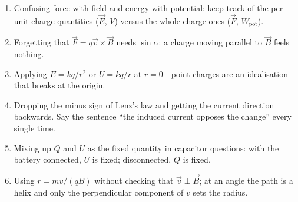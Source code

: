 \begin{remark}\label{rmk:mistakes}
\begin{enumerate}[label=\alph*)]
  \item Confusing force with field and energy with potential: keep track of the per-unit-charge quantities ($\vec{E}$, $V$) versus the whole-charge ones ($\vec{F}$, $W_\text{pot}$).
  \item Forgetting that $\vec{F} = q\vec{v}\times\vec{B}$ needs $\sin\alpha$: a charge moving parallel to $\vec{B}$ feels nothing.
  \item Applying $E = k q / r^2$ or $U = kq/r$ at $r = 0$---point charges are an idealisation that breaks at the origin.
  \item Dropping the minus sign of Lenz's law and getting the current direction backwards. Say the sentence ``the induced current opposes the change'' every single time.
  \item Mixing up $Q$ and $U$ as the fixed quantity in capacitor questions: with the battery connected, $U$ is fixed; disconnected, $Q$ is fixed.
  \item Using $r = mv/(qB)$ without checking that $\vec{v}\perp\vec{B}$; at an angle the path is a helix and only the perpendicular component of $v$ sets the radius.
\end{enumerate}
\end{remark}
